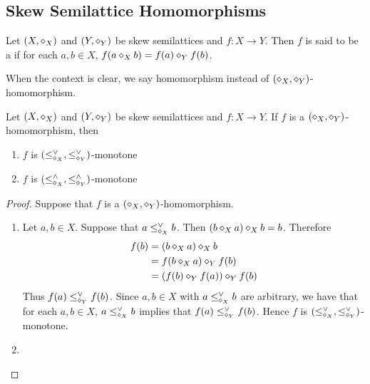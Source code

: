 \documentclass{book}
\begin{document}
	
	
	
	
	
	
	
	
	
	
	
	
	
	
	
	
	
	
	
	
	
	
	
	
	
	
	
	
	
	\subsection{Skew Semilattice Homomorphisms}
	
	\begin{defn}
		Let $(X, \diamond_X)$ and $(Y, \diamond_Y)$ be skew semilattices and $f:X \rightarrow Y$. Then $f$ is said to be a  if for each $a,b \in X$, $f(a \diamond_X b) = f(a) \diamond_Y f(b)$.
	\end{defn}
	
	\begin{note}
		When the context is clear, we say homomorphism instead of $(\diamond_X, \diamond_Y)$-homomorphism.
	\end{note}
	
	\begin{ex}
		Let $(X, \diamond_X)$ and $(Y, \diamond_Y)$ be skew semilattices and $f:X \rightarrow Y$. If $f$ is a $(\diamond_X, \diamond_Y)$-homomorphism, then 
		\begin{enumerate}
			\item $f$ is $(\leq_{\diamond_X}^{\vee}, \leq_{\diamond_Y}^{\vee})$-monotone
			\item $f$ is $(\leq_{\diamond_X}^{\wedge}, \leq_{\diamond_Y}^{\wedge})$-monotone
		\end{enumerate}
	\end{ex}
	
	\begin{proof}
		Suppose that $f$ is a $(\diamond_X, \diamond_Y)$-homomorphism. 
		\begin{enumerate}
			\item Let $a,b \in X$. Suppose that $a \leq_{\diamond_X}^{\vee} b$. Then $(b \diamond_X a) \diamond_X b = b$. Therefore 
			\begin{align*}
				f(b)
				& = (b \diamond_X a) \diamond_X b \\
				& = f(b \diamond_X a) \diamond_Y f(b) \\
				& = (f(b) \diamond_Y f(a)) \diamond_Y f(b) \\
			\end{align*}
			Thus $f(a) \leq_{\diamond_Y}^{\vee} f(b)$. Since $a,b \in X$ with $a \leq_{\diamond_X}^{\vee} b$ are arbitrary, we have that for each $a,b \in X$, $a \leq_{\diamond_X}^{\vee} b$ implies that $f(a) \leq_{\diamond_Y}^{\vee} f(b)$. Hence $f$ is $(\leq_{\diamond_X}^{\vee}, \leq_{\diamond_Y}^{\vee})$-monotone.
			\item {}
		\end{enumerate}
	\end{proof}
	
\end{document}
